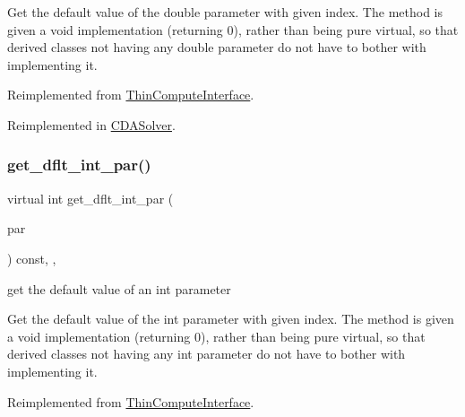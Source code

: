 Get the default value of the double parameter with given index. The method is given a void implementation (returning 0), rather than being pure virtual, so that derived classes not having any double parameter do not have to bother with implementing it. 

Reimplemented from \mbox{\hyperlink{class_s_m_spp__di__unipi__it_1_1_thin_compute_interface_ae2d249f431892cbf41ccf19204b78228}{Thin\+Compute\+Interface}}.



Reimplemented in \mbox{\hyperlink{class_s_m_spp__di__unipi__it_1_1_c_d_a_solver_a465a771c115acf8d5f4e32e22f003014}{C\+D\+A\+Solver}}.

\mbox{\label{class_s_m_spp__di__unipi__it_1_1_solver_a75dd1491b74c4b9476755e061dce3e04}} 
\subsubsection{\texorpdfstring{get\+\_\+dflt\+\_\+int\+\_\+par()}{get\_dflt\_int\_par()}}
{\footnotesize\ttfamily virtual int get\+\_\+dflt\+\_\+int\+\_\+par (\begin{DoxyParamCaption}\item[{const \mbox{\hyperlink{class_s_m_spp__di__unipi__it_1_1_thin_compute_interface_aa3d710629ad8c434286726ad810c3b47}{idx\+\_\+type}}}]{par }\end{DoxyParamCaption}) const\hspace{0.3cm}{\ttfamily [inline]}, {\ttfamily [override]}, {\ttfamily [virtual]}}



get the default value of an int parameter 

Get the default value of the int parameter with given index. The method is given a void implementation (returning 0), rather than being pure virtual, so that derived classes not having any int parameter do not have to bother with implementing it. 

Reimplemented from \mbox{\hyperlink{class_s_m_spp__di__unipi__it_1_1_thin_compute_interface_aee367363e42f86be5376165878f958f5}{Thin\+Compute\+Interface}}.



